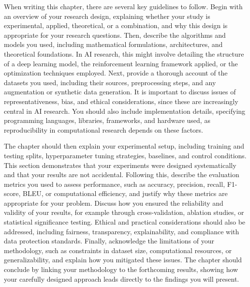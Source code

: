 \documentclass[PCOM,Thesis,Review]{mpThesis}
\begin{document}
\begin{MainMatter}
\begin{Remark}
When writing this chapter, there are several key guidelines to follow.
Begin with an overview of your research design, explaining whether your study is experimental, applied, theoretical, or a combination,
and why this design is appropriate for your research questions.
Then, describe the algorithms and models you used, including mathematical formulations, architectures, and theoretical foundations.
In AI research, this might involve detailing the structure of a deep learning model, the reinforcement learning framework applied, or the optimization techniques employed.
Next, provide a thorough account of the datasets you used, including their sources, preprocessing steps, and any augmentation or synthetic data generation.
It is important to discuss issues of representativeness, bias, and ethical considerations, since these are increasingly central in AI research.
You should also include implementation details, specifying programming languages, libraries, frameworks, and hardware used,
as reproducibility in computational research depends on these factors.

The chapter should then explain your experimental setup, including training and testing splits, hyperparameter tuning strategies, baselines, and control conditions.
This section demonstrates that your experiments were designed systematically and that your results are not accidental.
Following this, describe the evaluation metrics you used to assess performance, such as accuracy, precision, recall, F1-score, BLEU, or computational efficiency,
and justify why these metrics are appropriate for your problem.
Discuss how you ensured the reliability and validity of your results, for example through cross-validation, ablation studies, or statistical significance testing.
Ethical and practical considerations should also be addressed, including fairness, transparency, explainability, and compliance with data protection standards.
Finally, acknowledge the limitations of your methodology, such as constraints in dataset size, computational resources, or generalizability, and explain how you mitigated these issues.
The chapter should conclude by linking your methodology to the forthcoming results, showing how your carefully designed approach leads directly to the findings you will present.


\end{Remark}
\end{MainMatter}
\end{document}
